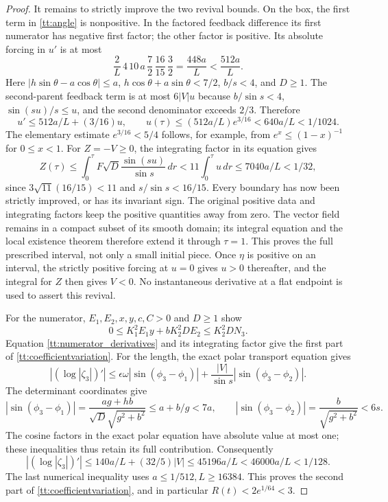 \begin{proof}
It remains to strictly improve the two revival bounds. On the box,
the first term in \eqref{tt:angle} is nonpositive. In the factored
feedback difference its first numerator has negative first factor;
the other factor is positive. Its absolute forcing in $u'$ is at most
\[
 \frac2L\,4\,10\,a\,\frac72\,\frac{16}{15}\,\frac32
 =\frac{448a}{L}<\frac{512a}{L}.
\]
Here $|h\sin\theta-a\cos\theta|\leq a$,
$h\cos\theta+a\sin\theta<7/2$, $b/s<4$, and $D\geq1$.
The second-parent feedback term is at most $6|V|u$ because
$b/\sin s<4$, $\sin(su)/s\leq u$, and the second denominator
exceeds $2/3$. Therefore
\[
 u'\leq512a/L+(3/16)u,\qquad
 u(\tau)\leq(512a/L)e^{3/16}<640a/L<1/1024.
\]
The elementary estimate $e^{3/16}<5/4$ follows, for example,
from $e^x\leq(1-x)^{-1}$ for $0\leq x<1$.
For $Z=-V\geq0$, the integrating factor in its equation gives
\[
 Z(\tau)\leq\int_0^\tau
      F\sqrt D\frac{\sin(su)}{\sin s}\,dr
 <11\int_0^\tau u\,dr\leq7040a/L<1/32,
\]
since $3\sqrt{11}(16/15)<11$ and $s/\sin s<16/15$.
Every boundary has now been strictly improved, or has its invariant
sign. The original positive data and integrating factors keep the
positive quantities away from zero. The vector field remains in a
compact subset of its smooth domain; its integral equation and the
local existence theorem therefore extend it through $\tau=1$.
This proves the full prescribed interval, not only a small initial
piece. Once $\eta$ is positive on an interval, the strictly positive
forcing at $u=0$ gives $u>0$ thereafter, and the integral for $Z$
then gives $V<0$. No instantaneous derivative at a flat endpoint is
used to assert this revival.

For the numerator, $E_1,E_2,x,y,c,C>0$ and $D\geq1$ show
\[
 0\leq K_1^2E_1y+bK_2^2DE_2\leq K_2^2D N_3.
\]
Equation \eqref{tt:numerator_derivatives} and its integrating factor
give the first part of \eqref{tt:coefficientvariation}.
For the length, the exact polar transport equation gives
\[
 \left|(\log|\zeta_3|)'\right|
 \leq\epsilon\omega|\sin(\phi_3-\phi_1)|
       +\frac{|V|}{\sin s}|\sin(\phi_3-\phi_2)|.
\]
The determinant coordinates give
\[
 |\sin(\phi_3-\phi_1)|=
 \frac{ag+hb}{\sqrt D\sqrt{g^2+b^2}}\leq a+b/g<7a,
 \qquad
 |\sin(\phi_3-\phi_2)|=\frac b{\sqrt{g^2+b^2}}<6s.
\]
The cosine factors in the exact polar equation have absolute value
at most one; these inequalities thus retain its full contribution.
Consequently
\[
 |(\log|\zeta_3|)'|
 \leq140a/L+(32/5)|V|\leq45196a/L<46000a/L<1/128.
\]
The last numerical inequality uses $a\leq1/512,L\geq16384$.
This proves the second part of \eqref{tt:coefficientvariation}, and
in particular $R(t)<2e^{1/64}<3$.


\end{proof}
